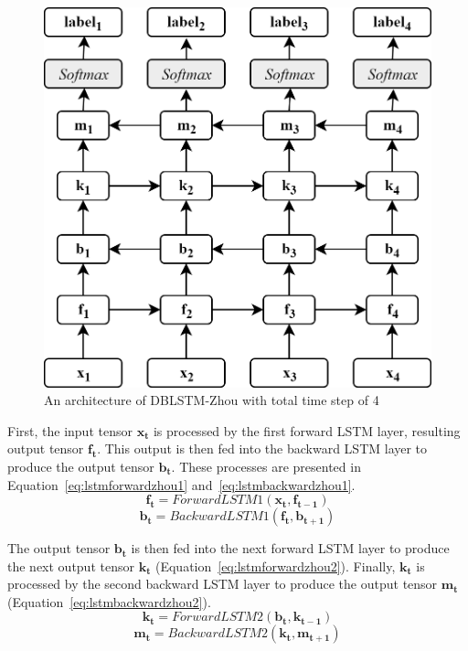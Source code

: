\begin{figure}
	\centering
	\includegraphics[width=0.75\linewidth]{images/dblstmzhou}
	\caption{An architecture of DBLSTM-Zhou with total time step of 4}
	\label{fig:dblstmzhou}
\end{figure}

First, the input tensor $\mathbf{x_{t}}$ is processed by the first forward LSTM layer, resulting output tensor $\mathbf{f_{t}}$. This output is then fed into the backward LSTM layer to produce the output tensor $\mathbf{b_{t}}$. These processes are presented in Equation~\ref{eq:lstmforwardzhou1} and~\ref{eq:lstmbackwardzhou1}.
\begin{equation}
\label{eq:lstmforwardzhou1}
\mathbf{f_{t}} = ForwardLSTM1(\mathbf{x_{t}}, \mathbf{f_{t-1}})
\end{equation}
\begin{equation}
\label{eq:lstmbackwardzhou1}
\mathbf{b_{t}} = BackwardLSTM1(\mathbf{f_{t}}, \mathbf{b_{t+1}})
\end{equation}

The output tensor $\mathbf{b_{t}}$ is then fed into the next forward LSTM layer to produce the next output tensor $\mathbf{k_{t}}$ (Equation~\ref{eq:lstmforwardzhou2}). Finally, $\mathbf{k_{t}}$ is processed by the second backward LSTM layer to produce the output tensor $\mathbf{m_{t}}$ (Equation~\ref{eq:lstmbackwardzhou2}).
\begin{equation}
\label{eq:lstmforwardzhou2}
\mathbf{k_{t}} = ForwardLSTM2(\mathbf{b_{t}}, \mathbf{k_{t-1}})
\end{equation}
\begin{equation}
\label{eq:lstmbackwardzhou2}
\mathbf{m_{t}} = BackwardLSTM2(\mathbf{k_{t}}, \mathbf{m_{t+1}})
\end{equation}

